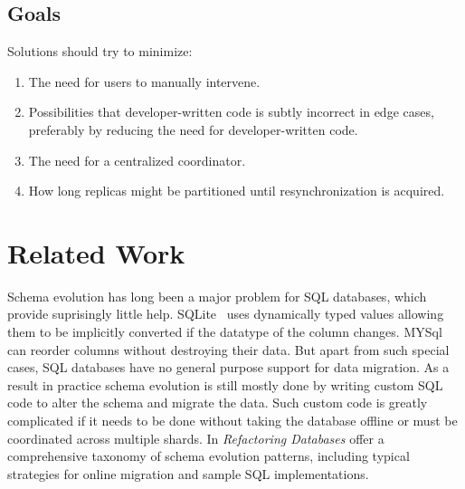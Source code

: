 \documentclass[english,submission]{programming}
\begin{document}
\subsection{Goals}
Solutions should try to minimize:

\begin{enumerate}
  \item The need for users to manually intervene.
  \item Possibilities that developer-written code is subtly incorrect in edge cases, preferably by reducing the need for developer-written code.
  \item The need for a centralized coordinator.
  \item How long replicas might be partitioned until resynchronization is acquired.
\end{enumerate}




\section{Related Work}

Schema evolution has long been a major problem for SQL databases, which provide suprisingly little help. SQLite~\cite{sqliteDatatypes} uses dynamically typed values allowing them to be implicitly converted if the datatype of the column changes. MYSql~\cite{mysqlAlterTable} can reorder columns without destroying their data. But apart from such special cases, SQL databases have no general purpose support for data migration. As a result in practice schema evolution is still mostly done by writing custom SQL code to alter the schema and migrate the data. Such custom code is greatly complicated if it needs to be done without taking the database offline or must be coordinated across multiple shards. In \textit{Refactoring Databases} \citet{ambler06} offer a comprehensive taxonomy of schema evolution patterns, including typical strategies for online migration and sample SQL implementations.
\end{document}
